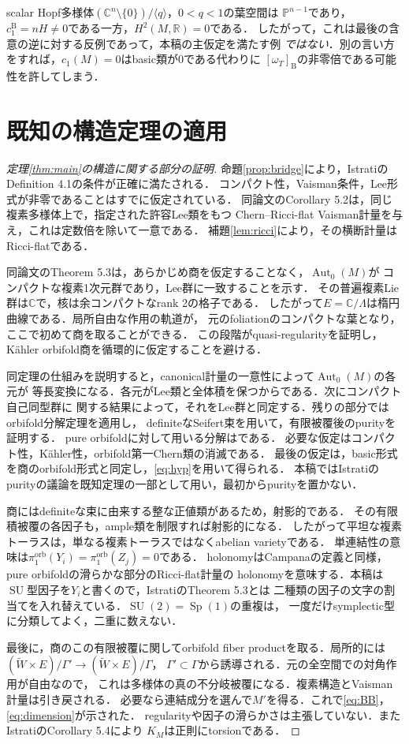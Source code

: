 \documentclass[12pt]{amsart}
\theoremstyle{definition}
\theoremstyle{remark}
\numberwithin{equation}{section}
\DeclareMathOperator{\Autop}{Aut}
\newcommand{\orb}{\mathrm{orb}}
\newcommand{\R}{\mathbb{R}}
\newcommand{\C}{\mathbb{C}}
\newcommand{\mP}{\mathbb{P}}
\newcommand{\bas}{\mathrm{B}}
\newcommand{\SU}{\operatorname{SU}}
\newcommand{\Sp}{\operatorname{Sp}}
\newcommand{\wt}{\omega_{T}}
\begin{document}
scalar Hopf多様体$(\C^n\setminus\{0\})/\langle q\rangle$，$0<q<1$の葉空間は
$\mP^{n-1}$であり，$c_1^{\bas}=nH\ne0$である一方，$H^2(M,\R)=0$である．
したがって，これは最後の含意の逆に対する反例であって，本稿の主仮定を満たす例
\emph{ではない}．別の言い方をすれば，$c_1(M)=0$はbasic類が0である代わりに
$[\wt]_{\bas}$の非零倍である可能性を許してしまう．

\section{既知の構造定理の適用}\label{sec:structure}
\begin{proof}[定理\ref{thm:main}の構造に関する部分の証明]
命題\ref{prop:bridge}により，IstratiのDefinition 4.1の条件が正確に満たされる．
コンパクト性，Vaisman条件，Lee形式が非零であることはすでに仮定されている．
同論文のCorollary 5.2は，同じ複素多様体上で，指定された許容Lee類をもつ
Chern--Ricci-flat Vaisman計量を与え，これは定数倍を除いて一意である．
補題\ref{lem:ricci}により，その横断計量はRicci-flatである．

同論文のTheorem 5.3は，あらかじめ商を仮定することなく，$\Autop_0(M)$が
コンパクトな複素1次元群であり，Lee群に一致することを示す．
その普遍複素Lie群は$\C$で，核は余コンパクトなrank 2の格子である．
したがって$E=\C/\Lambda$は楕円曲線である．局所自由な作用の軌道が，
元のfoliationのコンパクトな葉となり，ここで初めて商を取ることができる．
この段階がquasi-regularityを証明し，K\"ahler orbifold商を循環的に仮定することを避ける．

同定理の仕組みを説明すると，canonical計量の一意性によって$\Autop_0(M)$の各元が
等長変換になる．各元がLee類と全体積を保つからである．次にコンパクト自己同型群に
関する結果によって，それをLee群と同定する．残りの部分ではorbifold分解定理を適用し，
definiteなSeifert束を用いて，有限被覆後のpurityを証明する．
pure orbifoldに対して用いる分解は\cite[Theorem 6.4, Definition 6.5]{Campana}である．
必要な仮定はコンパクト性，K\"ahler性，orbifold第一Chern類の消滅である．
最後の仮定は，basic形式を商のorbifold形式と同定し，\eqref{eq:hyp}を用いて得られる．
本稿ではIstratiのpurityの議論を既知定理の一部として用い，最初からpurityを置かない．

商にはdefiniteな束に由来する整な正値類があるため，射影的である．
その有限積被覆の各因子も，ample類を制限すれば射影的になる．
したがって平坦な複素トーラスは，単なる複素トーラスではなくabelian varietyである．
単連結性の意味は$\pi_1^{\orb}(Y_i)=\pi_1^{\orb}(Z_j)=0$である．
holonomyはCampanaの定義と同様，pure orbifoldの滑らかな部分のRicci-flat計量の
holonomyを意味する．本稿は$\SU$型因子を$Y_i$と書くので，IstratiのTheorem 5.3とは
二種類の因子の文字の割当てを入れ替えている．$\SU(2)=\Sp(1)$の重複は，
一度だけsymplectic型に分類してよく，二重に数えない．

最後に，商のこの有限被覆に関してorbifold fiber productを取る．局所的には
$(\widetilde W\times E)/\Gamma'\to(\widetilde W\times E)/\Gamma$，
$\Gamma'\subset\Gamma$から誘導される．元の全空間での対角作用が自由なので，
これは多様体の真の不分岐被覆になる．複素構造とVaisman計量は引き戻される．
必要なら連結成分を選んで$M'$を得る．これで\eqref{eq:BB}，\eqref{eq:dimension}が示された．
regularityや因子の滑らかさは主張していない．またIstratiのCorollary 5.4により
$K_M$は正則にtorsionである．
\end{proof}
\end{document}
